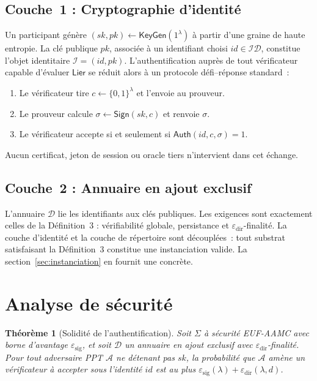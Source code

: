 \documentclass[11pt,a4paper]{article}
\newtheorem{theoreme}{Théorème}[section]
\begin{document}
\subsection{Couche~1 : Cryptographie d'identité}

Un participant génère $(sk, pk) \gets \mathsf{KeyGen}(1^\lambda)$ à partir
d'une graine de haute entropie.  La clé publique $pk$, associée à un
identifiant choisi $id \in \mathcal{ID}$, constitue l'objet identitaire
$\mathcal{I} = (id, pk)$.  L'authentification auprès de tout vérificateur
capable d'évaluer $\mathsf{Lier}$ se réduit alors à un protocole
défi--réponse standard~:

\begin{enumerate}[leftmargin=*]
  \item Le vérificateur tire $c \gets \{0,1\}^\lambda$ et l'envoie au prouveur.
  \item Le prouveur calcule $\sigma \gets \mathsf{Sign}(sk, c)$ et renvoie $\sigma$.
  \item Le vérificateur accepte si et seulement si $\mathsf{Auth}(id, c, \sigma) = 1$.
\end{enumerate}

Aucun certificat, jeton de session ou oracle tiers n'intervient dans cet échange.

\subsection{Couche~2 : Annuaire en ajout exclusif}

L'annuaire $\mathcal{D}$ lie les identifiants aux clés publiques.  Les
exigences sont exactement celles de la Définition~3 : vérifiabilité globale,
persistance et $\varepsilon_{\mathrm{dir}}$-finalité.  La couche d'identité
et la couche de répertoire sont découplées~: tout substrat satisfaisant la
Définition~3 constitue une instanciation valide.  La section~\ref{sec:instanciation}
en fournit une concrète.

\section{Analyse de sécurité}

\begin{theoreme}[Solidité de l'authentification]
  \label{thm:solidite}
  Soit $\Sigma$ à sécurité EUF-AAMC avec borne d'avantage
  $\varepsilon_{\mathrm{sig}}$, et soit $\mathcal{D}$ un annuaire en ajout
  exclusif avec $\varepsilon_{\mathrm{dir}}$-finalité.  Pour tout adversaire
  PPT $\mathcal{A}$ ne détenant pas $sk$, la probabilité que $\mathcal{A}$
  amène un vérificateur à accepter sous l'identité $id$ est au plus
  $\varepsilon_{\mathrm{sig}}(\lambda) + \varepsilon_{\mathrm{dir}}(\lambda, d)$.
\end{theoreme}
\end{document}
